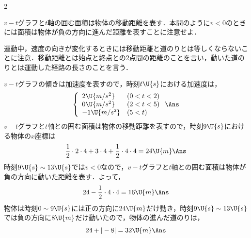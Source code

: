 \begin{multicols}{2}
\begin{sisin}
$v-t$グラフと$t$軸の囲む面積は物体の移動距離を表す．本問のように$v<0$のときには面積は物体が負の方向に進んだ距離を表すことに注意せよ．

運動中，速度の向きが変化するときには移動距離と道のりとは等しくならないことに注意．移動距離とは始点と終点との2点間の距離のことを言い，動いた道のりとは運動した経路の長さのことを言う．
\end{sisin}
\begin{komon}
 $v-t$グラフの傾きは加速度を表すので，時刻$t\U{s}$における加速度は，
       \[\left\{\begin{array}{ll}
         2\U{m/s^2} & (0<t<2)\\
         0\U{m/s^2} & (2<t<5)\\
         -1\U{m/s^2} & (5<t)
       \end{array}\right.\Ans\]
 $v-t$グラフと$t$軸との囲む面積は物体の移動距離を表すので，時刻$9\U{s}$における物体の$x$座標は
       \[\frac{1}{2}\cdot 2\cdot 4+3\cdot 4+\frac{1}{2}\cdot 4\cdot 4=24\U{m}\Ans\]
 時刻$9\U{s}\sim 13\U{s}$では$v<0$なので，$v-t$グラフと$t$軸との囲む面積は物体が負の方向に動いた距離を表す．よって，
       \[24-\frac{1}{2}\cdot 4\cdot 4=16\U{m}\Ans\]
 物体は時刻$0\sim 9\U{s}$には正の方向に$24\U{m}$だけ動き，時刻$9\U{s}\sim 13\U{s}$では負の方向に$8\U{m}$だけ動いたので，物体の進んだ道のりは，
       \[24+|-8|=32\U{m}\Ans\]
\end{komon}

\end{multicols}

%
%
%





%




